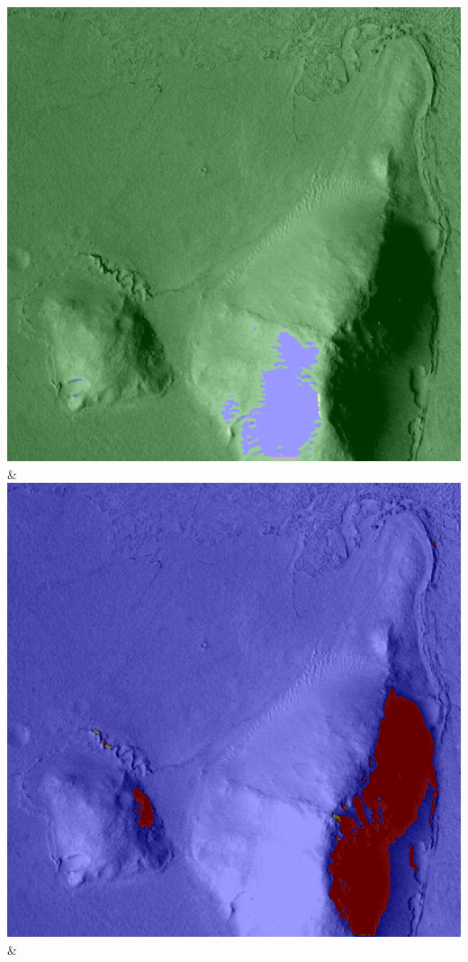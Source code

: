 \begin{table}[h!]
\begin{tabularx}{\textwidth}
		\includegraphics[width=0.9\linewidth]{images/gen/number_of_segments/p03_04.png_5.png} &
		\includegraphics[width=0.9\linewidth]{images/gen/number_of_segments/p03_04.png_10.png} &

\end{tabularx}
\end{table}
